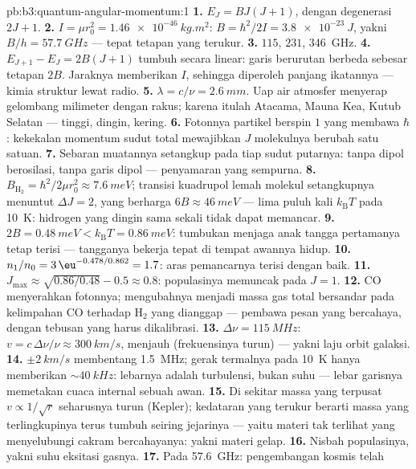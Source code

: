 \begin{solution}{pb:b3:quantum-angular-momentum:1}
\textbf{1.} $E_J = BJ(J+1)$, dengan degenerasi $2J + 1$.
\textbf{2.} $I = \mu r_0^2 = \qty{1.46e-46}{kg.m^2}$: $B =
\hbar^2/2I = \qty{3.8e-23}{J}$, yakni $B/h = \qty{57.7}{GHz}$ ---
tepat tetapan yang terukur.
\textbf{3.} $115$, $231$, \qty{346}{GHz}.
\textbf{4.} $E_{J+1} - E_J = 2B(J+1)$ tumbuh secara linear: garis
berurutan berbeda sebesar tetapan $2B$. Jaraknya memberikan $I$,
sehingga diperoleh panjang ikatannya --- kimia struktur lewat radio.
\textbf{5.} $\lambda = c/\nu = \qty{2.6}{mm}$. Uap air atmosfer
menyerap gelombang milimeter dengan rakus; karena itulah Atacama, Mauna
Kea, Kutub Selatan --- tinggi, dingin, kering.
\textbf{6.} Fotonnya partikel berspin $1$ yang membawa $\hbar$:
kekekalan momentum sudut total mewajibkan $J$ molekulnya berubah satu
satuan.
\textbf{7.} Sebaran muatannya setangkup pada tiap sudut putarnya: tanpa
dipol berosilasi, tanpa garis dipol --- penyamaran yang sempurna.
\textbf{8.} $B_{\text{H}_2} = \hbar^2/2\mu r_0^2 \approx
\qty{7.6}{meV}$; transisi kuadrupol lemah molekul setangkupnya menuntut
$\Delta J = 2$, yang berharga $6B \approx
\qty{46}{meV}$ --- lima puluh kali $k_{\text{B}}T$ pada \qty{10}{K}:
hidrogen yang dingin sama sekali tidak dapat memancar.
\textbf{9.} $2B = \qty{0.48}{meV} < k_{\text{B}}T = \qty{0.86}{meV}$:
tumbukan menjaga anak tangga pertamanya tetap terisi --- tangganya
bekerja tepat di tempat awannya hidup.
\textbf{10.} $n_1/n_0 = 3\,\eu^{-0.478/0.862} = 1.7$: aras pemancarnya
terisi dengan baik.
\textbf{11.} $J_{\max} \approx \sqrt{0.86/0.48} - 0.5 \approx 0.8$:
populasinya memuncak pada $J = 1$.
\textbf{12.} CO menyerahkan fotonnya; mengubahnya menjadi massa gas
total bersandar pada kelimpahan CO terhadap H$_2$ yang dianggap ---
pembawa pesan yang bercahaya, dengan tebusan yang harus dikalibrasi.
\textbf{13.} $\Delta\nu = \qty{115}{MHz}$: $v = c\,\Delta\nu/\nu
\approx \qty{300}{km/s}$, menjauh (frekuensinya turun) --- yakni laju
orbit galaksi.
\textbf{14.} $\pm\qty{2}{km/s}$ membentang \qty{1.5}{MHz}; gerak
termalnya pada \qty{10}{K} hanya memberikan $\sim\qty{40}{kHz}$:
lebarnya adalah turbulensi, bukan suhu --- lebar garisnya memetakan
cuaca internal sebuah awan.
\textbf{15.} Di sekitar massa yang terpusat $v \propto 1/\sqrt r$
seharusnya turun (Kepler); kedataran yang terukur berarti massa yang
terlingkupinya terus tumbuh seiring jejarinya --- yaitu materi tak
terlihat yang menyelubungi cakram bercahayanya: yakni materi gelap.
\textbf{16.} Nisbah populasinya, yakni suhu eksitasi gasnya.
\textbf{17.} Pada \qty{57.6}{GHz}: pengembangan kosmis telah

\end{solution}
